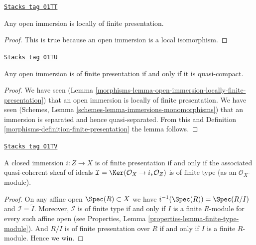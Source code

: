 \begin{lemma}
\label{morphisms-lemma-open-immersion-locally-finite-presentation}
\href{https://stacks.math.columbia.edu/tag/01TT}{\texttt{Stacks tag 01TT}}

Any open immersion is locally of finite presentation.
\end{lemma}

\begin{proof}
This is true because an open immersion is a local isomorphism.
\end{proof}

\begin{lemma}
\label{morphisms-lemma-quasi-compact-open-immersion-finite-presentation}
\href{https://stacks.math.columbia.edu/tag/01TU}{\texttt{Stacks tag 01TU}}

Any open immersion is of finite presentation if and only if
it is quasi-compact.
\end{lemma}

\begin{proof}

We have seen (Lemma \ref{morphisms-lemma-open-immersion-locally-finite-presentation})
that an open immersion is locally of finite presentation.
We have seen (Schemes, Lemma \ref{schemes-lemma-immersions-monomorphisms})
that an immersion is separated and hence quasi-separated. From this
and Definition \ref{morphisms-definition-finite-presentation} the lemma follows.
\end{proof}

\begin{lemma}
\label{morphisms-lemma-closed-immersion-finite-presentation}
\href{https://stacks.math.columbia.edu/tag/01TV}{\texttt{Stacks tag 01TV}}


A closed immersion $i : Z \to X$ is of finite presentation if and only if
the associated quasi-coherent sheaf of ideals
$\mathcal{I} = \Ker(\mathcal{O}_X \to i_*\mathcal{O}_Z)$
is of finite type (as an $\mathcal{O}_X$-module).
\end{lemma}

\begin{proof}
On any affine open $\Spec(R) \subset X$ we have
$i^{-1}(\Spec(R)) = \Spec(R/I)$ and
$\mathcal{I} = \widetilde{I}$. Moreover, $\mathcal{I}$
is of finite type if and only if $I$ is a finite $R$-module
for every such affine open (see
Properties, Lemma \ref{properties-lemma-finite-type-module}).
And $R/I$ is of finite presentation
over $R$ if and only if $I$ is a finite $R$-module. Hence we win.
\end{proof}

